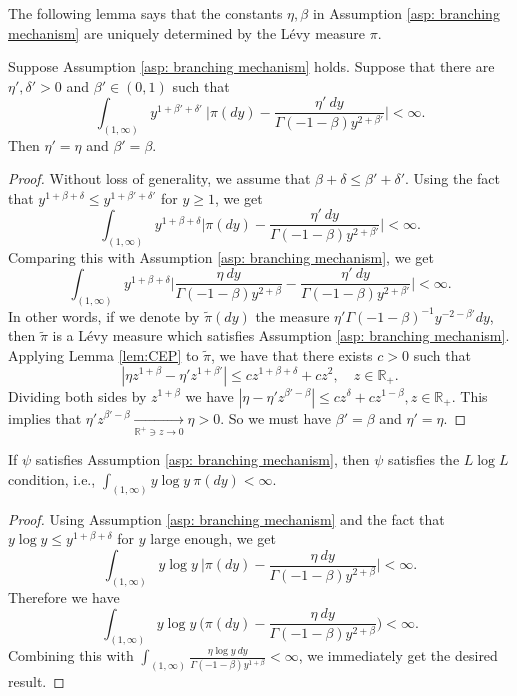 \documentclass[EJP]{ejpecp} %
\begin{document}
	The following lemma says that the constants $\eta, \beta$ in Assumption \ref{asp: branching mechanism} are uniquely determined by the L\'evy measure $\pi$.

\begin{lemma}
\label{lem: unique of beta and eta}
  	Suppose Assumption  \ref{asp: branching mechanism} holds. Suppose that there are $\eta', \delta'>0$ and $\beta'\in (0,1)$ such that
\[
  	\int_{(1,\infty)} y^{ 1 + \beta'  + \delta' }~ \Big| \pi(dy) - \frac {\eta' ~dy} {\Gamma (- 1 - \beta ) y^{2 + \beta'}} \Big|
    < \infty.
\]
	Then $\eta'= \eta$ and $\beta ' = \beta$.
\end{lemma}

\begin{proof}
	Without loss of generality, we assume that $\beta+\delta \leq \beta'+ \delta'$.
	Using  the fact that $y^{1+\beta+ \delta} \leq y^{1+\beta'+\delta'}$ for $y \geq 1$, we get
\[
    \int_{(1, \infty)} y^{1 + \beta + \delta}   \Big| \pi(dy) - \frac {\eta' ~dy} {\Gamma( - 1 - \beta)y^{2 + \beta'}} \Big|
    < \infty .
\]
	Comparing this with Assumption \ref{asp: branching mechanism}, we get
\[
    \int_{(1,\infty)} y^{ 1 + \beta + \delta} \Big| \frac { \eta ~dy} {\Gamma (- 1 - \beta) y^{2 + \beta}} - \frac {\eta' ~dy} {\Gamma (- 1 - \beta) y^{2 + \beta'}} \Big| 
    < \infty.
\]
	In other words, if we denote by $\widetilde \pi(dy)$ the measure $\eta' \Gamma(-1-\beta)^{-1} y^{-2-\beta'} dy$, then $\widetilde \pi$ is a L\'evy measure which satisfies Assumption \ref{asp: branching mechanism}.
	Applying Lemma \ref{lem:CEP} to $\widetilde \pi$, we have that there exists $c>0$ such that
\[
    | \eta z^{ 1 + \beta } - \eta' z^{ 1 + \beta' } |
    \leq c z^{ 1 + \beta + \delta } + c z^2, 
    \quad z \in \mathbb R_+.
\]
	Dividing both sides by $z^{1+\beta}$ we have $| \eta - \eta' z^{ \beta' - \beta }| \leq cz^{\delta}+cz^{1-\beta}, z \in \mathbb R_+.$
	This implies that $ \eta' z^{\beta' - \beta} \xrightarrow[\mathbb R^+\ni z\to 0]{} \eta >0. $
	So we must have $\beta'= \beta$ and $\eta'= \eta$.
\end{proof}

\begin{lemma}
\label{lem: LlogL criterion}
	If $\psi$ satisfies Assumption  \ref{asp: branching mechanism}, then $\psi$ satisfies the $L \log L$ condition, i.e., $ \int_{(1,\infty)} y \log y~\pi(dy) < \infty.$
\end{lemma}

\begin{proof}
	Using  Assumption \ref{asp: branching mechanism} and the fact that $y\log y \leq y^{1+\beta+\delta}$ for $y$ large enough, we get
\[
    \int_{(1,\infty)} y \log y ~\Big| \pi(dy) - \frac { \eta ~dy } { \Gamma ( - 1 - \beta ) y^{ 2 + \beta } } \Big|
    < \infty.
\]
	Therefore we have
\[
    \int_{ ( 1, \infty ) } y \log y ~\Big( \pi(dy) - \frac { \eta ~dy } { \Gamma ( - 1 - \beta ) y^{ 2 + \beta } } \Big)
    < \infty.
\]
  	Combining this with $\int_{ ( 1, \infty ) } \frac { \eta \log y ~dy } { \Gamma ( - 1 - \beta ) y^{ 1 + \beta } }< \infty$, we immediately get the desired result.
\end{proof}
\end{document}
